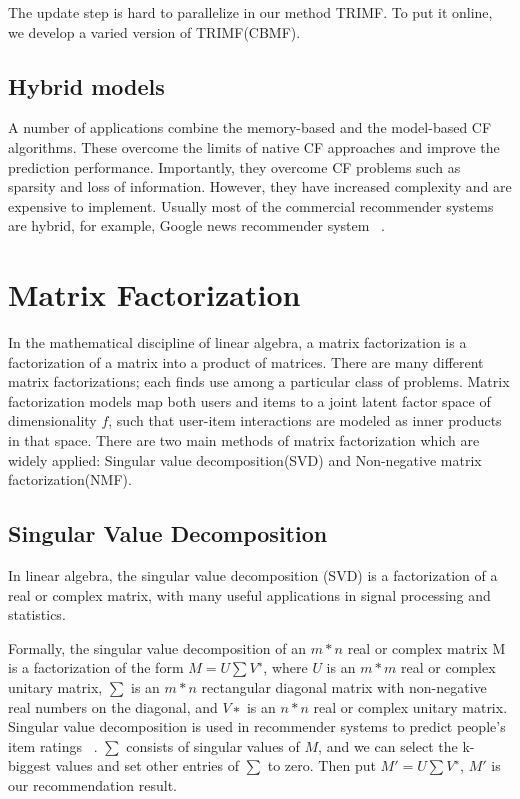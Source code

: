The update step is hard to parallelize in our method TRIMF. To put it online, we develop a varied version of TRIMF(CBMF).

\hspace{0.05in}
\subsection{Hybrid models}
A number of applications combine the memory-based and the model-based CF algorithms. These overcome the limits of native CF approaches and improve the prediction performance. Importantly, they overcome CF problems such as sparsity and loss of information. However, they have increased complexity and are expensive to implement. Usually most of the commercial recommender systems are hybrid, for example, Google news recommender system ~\cite{das2007google}.

\hspace{0.1in}
\section{Matrix Factorization}
In the mathematical discipline of linear algebra, a matrix factorization is a factorization of a matrix into a product of matrices. There are many different matrix factorizations; each finds use among a particular class of problems. Matrix factorization models map both users and items to a joint latent factor space of dimensionality $f$, such that user-item interactions are modeled as inner products in that space. There are two main methods of matrix factorization which are widely applied: Singular value decomposition(SVD) and Non-negative matrix factorization(NMF).
\hspace{0.05in}
\subsection{Singular Value Decomposition}
In linear algebra, the singular value decomposition (SVD) is a factorization of a real or complex matrix, with many useful applications in signal processing and statistics.

Formally, the singular value decomposition of an $m * n$ real or complex matrix M is a factorization of the form $M = U \sum V^∗$, where $U$ is an $m * m$ real or complex unitary matrix, $\sum$ is an $m * n$ rectangular diagonal matrix with non-negative real numbers on the diagonal, and $V∗$ is an $n * n$ real or complex unitary matrix. Singular value decomposition is used in recommender systems to predict people's item ratings ~\cite{Sarwar00applicationof}. $\sum$ consists of singular values of $M$, and we can select the k-biggest values and set other entries of $\sum$ to zero. Then put $M' = U \sum V^∗$, $M'$ is our recommendation result.

